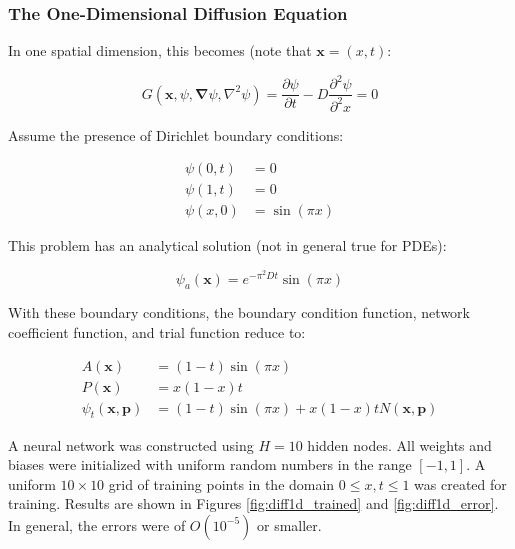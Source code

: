 \documentclass{article}
\begin{document}
\subsubsection{The One-Dimensional Diffusion Equation}

In one spatial dimension, this becomes (note that $\mathbf x = (x,t)$:

\begin{equation}
  G \left( \mathbf x, \psi, \mathbf \nabla \psi, \nabla^2 \psi \right) = \frac {\partial \psi} {\partial t} - D \frac {\partial^2 \psi} {\partial^2 x} = 0
\end{equation}

Assume the presence of Dirichlet boundary conditions:

\begin{equation}
\begin{split}
  \psi(0,t) &= 0 \\
  \psi(1,t) &= 0 \\
  \psi(x,0) &= \sin(\pi x)
\end{split}
\end{equation}

This problem has an analytical solution (not in general true for PDEs):

\begin{equation}
  \psi_a(\mathbf x) = e^{-\pi^2 D t} \sin(\pi x)
\end{equation}

With these boundary conditions, the boundary condition function, network coefficient function, and trial function reduce to:

\begin{equation}
\begin{split}
  A(\mathbf x) &= (1 - t)\sin(\pi x) \\
  P(\mathbf x) &= x(1 - x)t \\
  \psi_t(\mathbf x,\mathbf p) &= (1 - t)\sin(\pi x) + x(1 - x)t N(\mathbf x,\mathbf p)
\end{split}
\end{equation}

A neural network was constructed using $H=10$ hidden nodes. All weights and biases were initialized with uniform random numbers in the range $[-1,1]$. A uniform $10\times10$ grid of training points in the domain $0 \leq x,t \leq 1$ was created for training. Results are shown in Figures \ref{fig:diff1d_trained} and \ref{fig:diff1d_error}. In general, the errors were of $O(10^{-5})$ or smaller.
\end{document}

